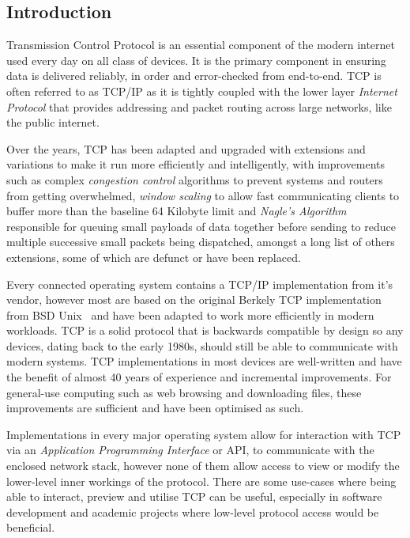 \documentclass[11pt,a4paper,british]{bhamarticle}
\begin{document}
\begin{multicols}{2}

\section{Introduction}
Transmission Control Protocol is an essential component of the modern internet used every day on all class of devices. It is the primary component in ensuring data is delivered reliably, in order and error-checked from end-to-end. TCP is often referred to as TCP/IP as it is tightly coupled with the lower layer \textit{Internet Protocol} that provides addressing and packet routing across large networks, like the public internet.

Over the years, TCP has been adapted and upgraded with extensions and variations to make it run more efficiently and intelligently, with improvements such as complex \textit{congestion control} algorithms to prevent systems and routers from getting overwhelmed, \textit{window scaling} to allow fast communicating clients to buffer more than the baseline 64 Kilobyte limit and \textit{Nagle's Algorithm}~\cite{rfc896} responsible for queuing small payloads of data together before sending to reduce multiple successive small packets being dispatched, amongst a long list of others extensions, some of which are defunct or have been replaced.

Every connected operating system contains a TCP/IP implementation from it's vendor, however most are based on the original Berkely TCP implementation from BSD Unix~\cite{rfc793} and have been adapted to work more efficiently in modern workloads. TCP is a solid protocol that is backwards compatible by design so any devices, dating back to the early 1980s, should still be able to communicate with modern systems. TCP implementations in most devices are well-written and have the benefit of almost 40 years of experience and incremental improvements. For general-use computing such as web browsing and downloading files, these improvements are sufficient and have been optimised as such.

Implementations in every major operating system allow for interaction with TCP via an \textit{Application Programming Interface} or API, to communicate with the enclosed network stack, however none of them allow access to view or modify the lower-level inner workings of the protocol. There are some use-cases where being able to interact, preview and utilise TCP can be useful, especially in software development and academic projects where low-level protocol access would be beneficial.


\end{multicols}
\end{document}
